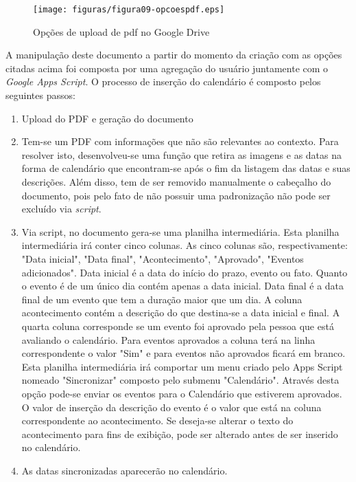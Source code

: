 \begin{figure}[hbtn]
   \centering
   \texttt{[image: figuras/figura09-opcoespdf.eps]}
   \caption{Opções de upload de pdf no Google Drive}
   \label{fig:GDriveOptions}
\end{figure} 

A manipulação deste documento a partir do momento da criação com as opções citadas acima foi composta por uma agregação do usuário juntamente com o \emph{Google Apps Script}. O processo de inserção do calendário é composto pelos seguintes passos:

\begin{enumerate}
\item Upload do PDF e geração do documento
\item Tem-se um PDF com informações que não são relevantes ao contexto. Para resolver isto, desenvolveu-se uma função que retira as imagens e as datas na forma de calendário que encontram-se após o fim da listagem das datas e suas descrições. Além disso, tem de ser removido manualmente o cabeçalho do documento, pois pelo fato de não possuir uma padronização não pode ser excluído via \emph{script}.
\item Via script, no documento gera-se uma planilha intermediária. Esta planilha intermediária irá conter cinco colunas. As cinco colunas são, respectivamente: "Data inicial", "Data final", "Acontecimento", "Aprovado", "Eventos adicionados". Data inicial é a data do início do prazo, evento ou fato. Quanto o evento é de um único dia contém apenas a data inicial. Data final é a data final de um evento que tem a duração maior que um dia. A coluna acontecimento contém a descrição do que destina-se a data inicial e final. A quarta coluna corresponde se um evento foi aprovado pela pessoa que está avaliando o calendário. Para eventos aprovados a coluna terá na linha correspondente o valor "Sim" e para eventos não aprovados ficará em branco. Esta planilha intermediária irá comportar um menu criado pelo Apps Script nomeado "Sincronizar" composto pelo submenu "Calendário". Através desta opção pode-se enviar os eventos para o Calendário que estiverem aprovados. O valor de inserção da descrição do evento é o valor que está na coluna correspondente ao acontecimento. Se deseja-se alterar o texto do acontecimento para fins de exibição, pode ser alterado antes de ser inserido no calendário.
\item As datas sincronizadas aparecerão no calendário.

\end{enumerate}

